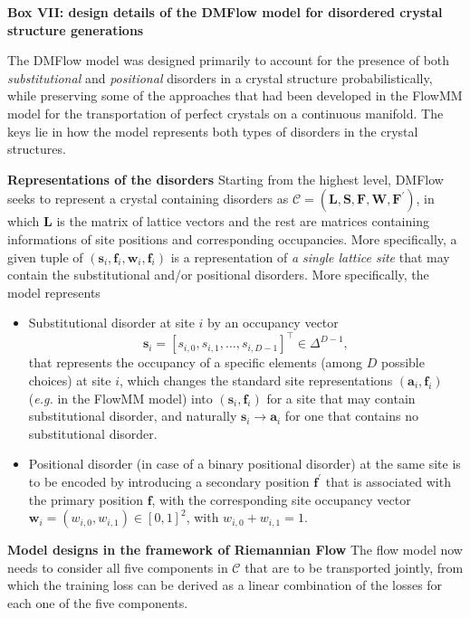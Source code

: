 \begin{myquote}
    \textbf{Box VII: design details of the DMFlow model for disordered crystal structure generations}

\footnotesize

\hspace{10pt} The DMFlow model was designed primarily to account for the presence of both \emph{substitutional} and \emph{positional} disorders in a crystal structure probabilistically, while preserving some of the approaches that had been developed in the FlowMM model for the transportation of perfect crystals on a continuous manifold. The keys lie in how the model represents both types of disorders in the crystal structures.

\hspace{10pt} \textbf{Representations of the disorders} Starting from the highest level, DMFlow seeks to represent a crystal containing disorders as $\mathcal{C}=(\bm{L},\bm{S},\bm{F},\bm{W},\bm{F}^\prime)$, in which $\bm{L}$ is the matrix of lattice vectors and the rest are matrices containing informations of site positions and corresponding occupancies. More specifically, a given tuple of $(\bm{s}_i,\bm{f}_i,\bm{w}_i,\bm{f}_i)$ is a representation of \emph{a single lattice site} that may contain the substitutional and/or positional disorders. More specifically, the model represents
\begin{itemize}
    \item Substitutional disorder at site $i$ by an occupancy vector
    \begin{equation*}
        \bm{s}_i=[s_{i,0},s_{i,1},\ldots,s_{i,D-1}]^\top\in\Delta^{D-1},
    \end{equation*}
    that represents the occupancy of a specific elements (among $D$ possible choices) at site $i$, which changes the standard site representations $(\bm{a}_i,\bm{f}_i)$ (\emph{e.g.} in the FlowMM model) into $(\bm{s}_i,\bm{f}_i)$ for a site that may contain substitutional disorder, and naturally $\bm{s}_i\to\bm{a}_i$ for one that contains no substitutional disorder.
    \item Positional disorder (in case of a binary positional disorder) at the same site is to be encoded by introducing a secondary position $\bm{f}^\prime$ that is associated with the primary position $\bm{f}$, with the corresponding site occupancy vector $\bm{w}_i=(w_{i,0},w_{i,1})\in[0,1]^2$, with $w_{i,0}+w_{i,1}=1$.
\end{itemize}

\hspace{10pt} \textbf{Model designs in the framework of Riemannian Flow} The flow model now needs to consider all five components in $\mathcal{C}$ that are to be transported jointly, from which the training loss can be derived as a linear combination of the losses for each one of the five components.


\end{myquote}

